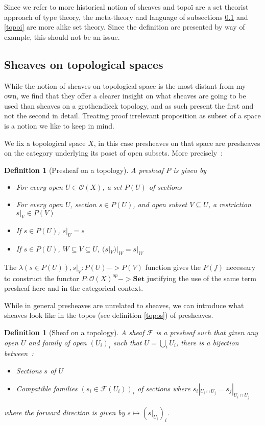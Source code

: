 \documentclass[11pt]{article}
\newtheorem{definition}[theorem]{Definition}
\newcommand{\0}{\mathbf{0}}
\newcommand{\1}{\mathbf{1}}
\begin{document}
Since we refer to more historical notion of sheaves and topoï are a set theorist approach of type theory, the meta-theory and language of subsections \ref{topsheaves} and \ref{topoi} are more alike set theory.
Since the definition are presented by way of example, this should not be an issue.

\subsection{Sheaves on topological spaces}\label{topsheaves}

While the notion of sheaves on topological space is the most distant from my own, we find that they offer a clearer insight on what sheaves are going to be used than sheaves on a grothendieck topology, and as such present the first and not the second in detail.
Treating proof irrelevant proposition as subset of a space is a notion we like to keep in mind.

We fix a topological space $X$, in this case presheaves on that space are presheaves on the category underlying its poset of open subsets. More precisely~:

\begin{definition}[Presheaf on a topology]
    A \emph{presheaf} $P$ is given by
    \begin{itemize}
        \item For every open $U \in \mathcal{O}(X)$, a set $P(U)$ of \emph{sections}
        \item For every open $U$, section $s\in P(U)$, and open subset $V\subseteq U$, a \emph{restriction} $s|_V\in P(V)$
        \item If $s\in P(U)$, $s|_U = s$
        \item If $s\in P(U)$, $W\subseteq V \subseteq U$, $(s|_V)|_W = s|_W$
    \end{itemize}
\end{definition}
The $\lambda (s\in P(U)), s|_V : P(U) -> P(V)$ function gives the $P(f)$ necessary to construct the functor $P : \mathcal{O}(X)^{op} -> \mathbf{Set}$ justifying the use of the same term presheaf here and in the categorical context.

While in general presheaves are unrelated to sheaves, we can introduce what sheaves look like in the topos (see definition \ref{topos}) of presheaves.

\begin{definition}[Sheaf on a topology]
    A \emph{sheaf} $\mathcal{F}$ is a presheaf such that given any open  $U$ and family of open $(U_i)_i$ such that $U = \bigcup_i U_i$, there is a bijection between~:
    \begin{itemize}
        \item Sections $s$ of $U$
        \item \emph{Compatible} families $(s_i\in \mathcal{F}(U_i))_i$ of sections where $s_i|_{U_i\cap U_j} = s_j|_{U_i\cap U_j}$
    \end{itemize}
    where the forward direction is given by $s \mapsto (s|_{U_i})_i$.
\end{definition}
\end{document}
